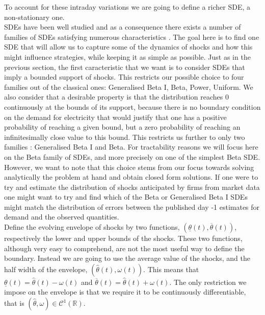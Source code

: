 To account for these intraday variations we are going to define a richer SDE, a non-stationary one. \\

SDEs have been well studied and as a consequence there exists a number of families of SDEs satisfying numerous characteristics \cite{enveloppe}. The goal here is to find one SDE that will allow us to capture some of the dynamics of shocks and how this might influence strategies, while keeping it as simple as possible. Just as in the previous section, the first caracteristic that we want is to consider SDEs that imply a bounded support of shocks. This restricts our possible choice to four families out of the classical ones: Generalised Beta I, Beta, Power, Uniform. We also consider that a desirable property is that the distribution reaches 0 continuously at the bounds of its support, because there is no boundary condition on the demand for electricity that would justify that one has a positive probability of reaching a given bound, but a zero probability of reaching an infinitesimally close value to this bound. This restricts us further to only two families : Generalised Beta I and Beta. For tractability reasons we will focus here on the Beta family of SDEs, and more precisely on one of the simplest Beta SDE. However, we want to note that this choice stems from our focus towards solving analytically the problem at hand and obtain closed form solutions. If one were to try and estimate the distribution of shocks anticipated by firms from market data one might want to try and find which of the Beta or Generalised Beta I SDEs might match the distribution of errors between the published day -1 estimates for demand and the observed quantities.\\

Define the evolving envelope of shocks by two functions, $(\underline{\theta}(t),\overline{\theta}(t))$, respectively the lower and upper bounds of the shocks. These two functions, although very easy to comprehend, are not the most useful way to define the boundary. Instead we are going to use the average value of the shocks, and the half width of the envelope, $(\hat{\theta}(t), \omega(t))$. This means that $\underline{\theta}(t)=\hat{\theta}(t)-\omega(t)$ and $\overline{\theta}(t)=\hat{\theta}(t)+\omega(t)$. The only restriction we impose on the envelope is that we require it to be continuously differentiable, that is $(\hat{\theta},\omega)\in\mathcal{C}^1(\mathbb{R})$.\\

